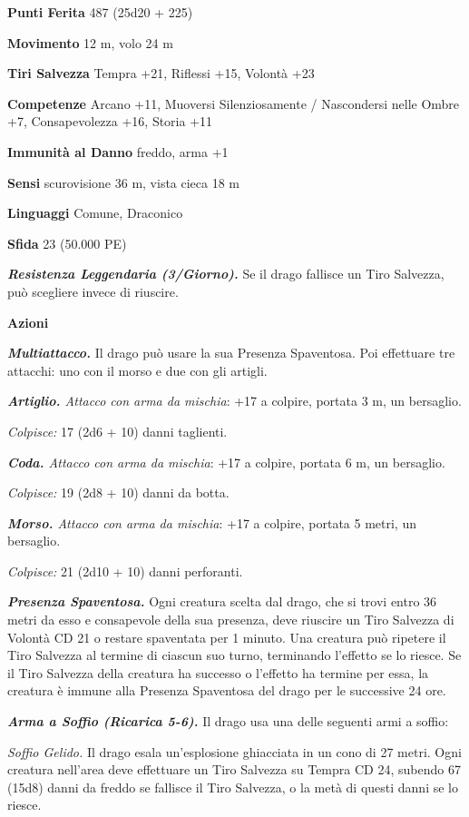 \begin{multicols}{2}
\textbf{Punti Ferita} 487 (25d20 + 225)

\textbf{Movimento} 12 m, volo 24 m

\textbf{Tiri Salvezza} Tempra +21, Riflessi +15, Volontà +23

\textbf{Competenze} Arcano +11, Muoversi Silenziosamente / Nascondersi nelle Ombre +7, Consapevolezza +16, Storia +11

\textbf{Immunità al Danno} freddo, arma +1

\textbf{Sensi} scurovisione 36 m, vista cieca 18 m

\textbf{Linguaggi} Comune, Draconico

\textbf{Sfida} 23 (50.000 PE)

\emph{\textbf{Resistenza Leggendaria (3/Giorno).}} Se il drago fallisce un Tiro Salvezza, può scegliere invece di riuscire.

\textbf{Azioni}

\emph{\textbf{Multiattacco.}} Il drago può usare la sua Presenza Spaventosa. Poi effettuare tre attacchi: uno con il morso e due con gli
artigli.

\emph{\textbf{Artiglio.} Attacco con arma da mischia}: +17 a colpire, portata 3 m, un bersaglio.

\emph{Colpisce:} 17 (2d6 + 10) danni taglienti.

\emph{\textbf{Coda.} Attacco con arma da mischia}: +17 a colpire, portata 6 m, un bersaglio.

\emph{Colpisce:} 19 (2d8 + 10) danni da botta.

\emph{\textbf{Morso.} Attacco con arma da mischia}: +17 a colpire, portata 5 metri, un bersaglio.

\emph{Colpisce:} 21 (2d10 + 10) danni perforanti.

\emph{\textbf{Presenza Spaventosa.}} Ogni creatura scelta dal drago, che si trovi entro 36 metri da esso e consapevole della sua presenza, deve riuscire un Tiro Salvezza di Volontà CD 21 o restare spaventata per 1 minuto. Una creatura può ripetere il Tiro Salvezza al termine di ciascun suo turno, terminando l'effetto se lo riesce. Se il Tiro Salvezza della creatura ha successo o l'effetto ha termine per essa, la creatura è immune alla Presenza Spaventosa del drago per le successive 24 ore.

\emph{\textbf{Arma a Soffio (Ricarica 5-6).}} Il drago usa una delle seguenti armi a soffio:

\emph{Soffio Gelido.} Il drago esala un'esplosione ghiacciata in un cono di 27 metri. Ogni creatura nell'area deve effettuare un Tiro Salvezza su Tempra CD 24, subendo 67 (15d8) danni da freddo se fallisce il Tiro Salvezza, o la metà di questi danni se lo riesce.


\end{multicols}
